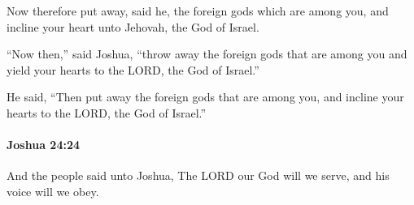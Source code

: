 			\begin{versebox}
					\item[BHS] 
					\item[ASV] Now therefore put away, said he, the foreign gods which are among you, and incline your heart unto Jehovah, the God of Israel.
					\item[NIV] “Now then,” said Joshua, “throw away the foreign gods that are among you and yield your hearts to the LORD, the God of Israel.”
					\item[NRSV] He said, “Then put away the foreign gods that are among you, and incline your hearts to the LORD, the God of Israel.”
			\end{versebox}

		\paragraph{Joshua 24:24} %
			\label{JOSHUA-24-24}

			And the people said unto Joshua, The LORD our God will we serve, and his voice will we obey.

